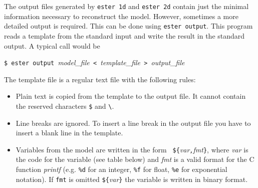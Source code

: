 The output files generated by {\tt ester 1d} and {\tt ester 2d} contain
just the minimal information necessary to reconstruct the model. However,
sometimes a more detailed output is required.  This can be done using
{\tt ester output}. This program reads a template from the standard input
and write the result in the standard output.  A typical call would be

\medskip
\noindent
\verb|$ ester output |{\it model\_file}\verb| < |{\it template\_file}\verb| > |{\it output\_file}

\medskip

The template file is a regular text file with the following rules:

\begin{itemize}
\item Plain text is copied from the template to the output file. It
cannot contain the reserved characters {\tt \$} and {\tt \textbackslash}.

\item Line breaks are ignored. To insert a line break in the output file
you have to insert a blank line in the template.

\item Variables from the model are written in the form \mbox{{\tt
\$\{}{\it var}{\tt ,}{\it fmt}{\tt \}}}, where {\it var} is the code
for the variable (see table below) and {\it fmt} is a valid format for
the C function {\it printf} (e.g. {\tt \%d} for an integer, {\tt \%f}
for float, {\tt \%e} for exponential notation).  If {\tt fmt} is omitted
{\tt\$\{}{\it var}{\tt \}} the variable is written in binary format.

\end{itemize}

